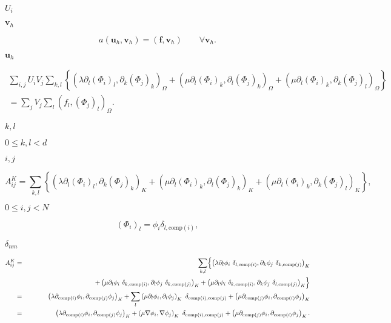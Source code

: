 \documentclass{article}
\begin{document}
$U_i$
\pagebreak

${\mathbf v}_h$
\pagebreak

\[ a({\mathbf u}_h, {\mathbf v}_h) = ({\mathbf f}, {\mathbf v}_h) \qquad \forall {\mathbf v}_h. \]
\pagebreak

${\mathbf u}_h$
\pagebreak

\begin{eqnarray*} \sum_{i,j} U_i V_j \sum_{k,l} \left\{ \left( \lambda \partial_l (\Phi_i)_l, \partial_k (\Phi_j)_k \right)_\Omega + \left( \mu \partial_l (\Phi_i)_k, \partial_l (\Phi_j)_k \right)_\Omega + \left( \mu \partial_l (\Phi_i)_k, \partial_k (\Phi_j)_l \right)_\Omega \right\} \\ = \sum_j V_j \sum_l \left( f_l, (\Phi_j)_l \right)_\Omega. \end{eqnarray*}
\pagebreak

$k,l$
\pagebreak

$0\le k,l < d$
\pagebreak

$i,j$
\pagebreak

\[ A^K_{ij} = \sum_{k,l} \left\{ \left( \lambda \partial_l (\Phi_i)_l, \partial_k (\Phi_j)_k \right)_K + \left( \mu \partial_l (\Phi_i)_k, \partial_l (\Phi_j)_k \right)_K + \left( \mu \partial_l (\Phi_i)_k, \partial_k (\Phi_j)_l \right)_K \right\}, \]
\pagebreak

$0\le i,j < N$
\pagebreak

\[ (\Phi_i)_l = \phi_i \delta_{l,\text{comp}(i)}, \]
\pagebreak

$\delta_{nm}$
\pagebreak

\begin{eqnarray*} A^K_{ij} &=& \sum_{k,l} \Bigl\{ \left( \lambda \partial_l \phi_i\ \delta_{l,\text{comp}(i)}, \partial_k \phi_j\ \delta_{k,\text{comp}(j)} \right)_K \\ &\qquad\qquad& + \left( \mu \partial_l \phi_i\ \delta_{k,\text{comp}(i)}, \partial_l \phi_j\ \delta_{k,\text{comp}(j)} \right)_K + \left( \mu \partial_l \phi_i\ \delta_{k,\text{comp}(i)}, \partial_k \phi_j\ \delta_{l,\text{comp}(j)} \right)_K \Bigr\} \\ &=& \left( \lambda \partial_{\text{comp}(i)} \phi_i, \partial_{\text{comp}(j)} \phi_j \right)_K + \sum_l \left( \mu \partial_l \phi_i, \partial_l \phi_j \right)_K \ \delta_{\text{comp}(i),\text{comp}(j)} + \left( \mu \partial_{\text{comp}(j)} \phi_i, \partial_{\text{comp}(i)} \phi_j \right)_K \\ &=& \left( \lambda \partial_{\text{comp}(i)} \phi_i, \partial_{\text{comp}(j)} \phi_j \right)_K + \left( \mu \nabla \phi_i, \nabla \phi_j \right)_K \ \delta_{\text{comp}(i),\text{comp}(j)} + \left( \mu \partial_{\text{comp}(j)} \phi_i, \partial_{\text{comp}(i)} \phi_j \right)_K. \end{eqnarray*}
\pagebreak
\end{document}
